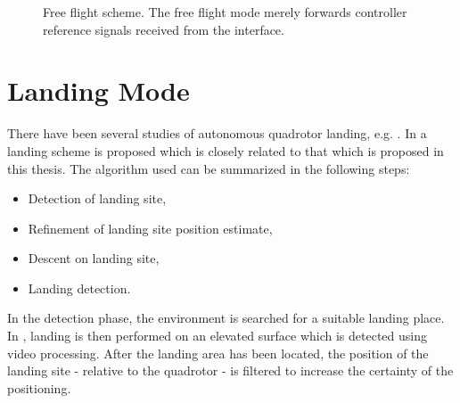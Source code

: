         \begin{figure}[H]
            \noindent{}
            \caption{Free flight scheme. The free flight mode merely forwards controller reference signals received from the interface.}
            \label{fig:logic:freeflightscheme}
        \end{figure}

    \section{Landing Mode}
        \label{ssec:logic:landing}
        There have been several studies of autonomous quadrotor landing,
        e.g. \citep{mellinger10perching,brockers:803111}.
        In \citep{brockers:803111} a landing scheme is proposed which is
        closely related to that which is proposed in this thesis.
        The algorithm used can be summarized in the following steps:
        \begin{itemize}
            \item Detection of landing site,
            \item Refinement of landing site position estimate,
            \item Descent on landing site,
            \item Landing detection.
        \end{itemize}

        In the detection phase, the environment is searched for a suitable
        landing place. In \citep{brockers:803111}, landing is then performed
        on an elevated surface which is detected using video processing.
        After the landing area has been located, the position of the
        landing site - relative to the quadrotor - is filtered to increase the
        certainty of the positioning.

